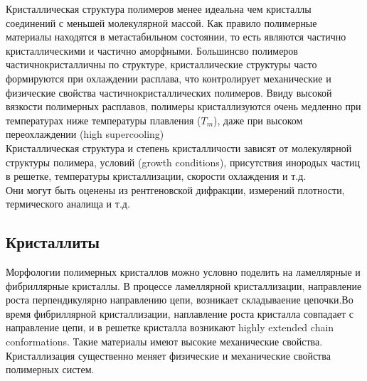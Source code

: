 Кристаллическая структура полимеров менее идеальна чем кристаллы соединений с меньшей молекулярной массой. Как правило полимерные материалы находятся в метастабильном состоянии, то есть являются частично кристаллическими и частично аморфными. Большинсво полимеров частичнокристалличны по структуре, кристаллические структуры часто формируются при охлаждении расплава, что контролирует механические и физические свойства частичнокристаллических полимеров. Ввиду высокой вязкости полимерных расплавов, полимеры кристаллизуются очень медленно при температурах ниже температуры плавления ($T_m$), даже при высоком переохлаждении (high supercooling)
\\
Кристаллическая структура и степень кристалличости зависят от молекулярной структуры полимера, условий (growth
conditions), присутствия инородых частиц в решетке, температуры кристаллизации, скорости охлаждения и т.д.\\
Они могут быть оценены из рентгеновской дифракции, измерений плотности, термического аналища и т.д.

\subsection{Кристаллиты}
Морфологии полимерных кристаллов можно условно поделить на ламеллярные и фибриллярные кристаллы. В процессе ламеллярной кристаллизации, направление роста перпендикулярно направлению цепи, возникает складываение цепочки.Во время фибриллярной кристаллизации, наплавление роста кристалла совпадает с направление цепи, и в решетке кристалла возникают highly extended chain conformations. Такие материалы имеют высокие механические свойства. Кристаллизация существенно меняет физические и механические свойства полимерных систем. \\

